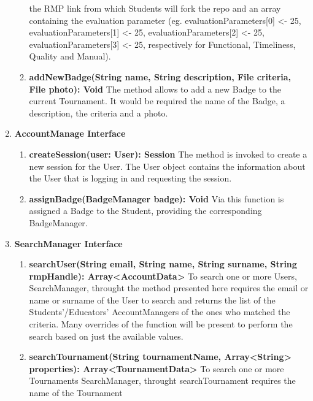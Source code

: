 \begin{enumerate}
\begin{enumerate}[label=$\bullet$]
            the RMP link from which Students will fork the repo and an array containing the evaluation parameter (eg. evaluationParameters[0] <- 25, evaluationParameters[1] <- 25, evaluationParameters[2] <- 25, evaluationParameters[3] <- 25,
            respectively for Functional, Timeliness, Quality and Manual).
            \item \textbf{addNewBadge(String name, String description, File criteria, File photo): Void} The method allows to add a new Badge to the current Tournament. It would be required the name of the Badge, a description, the criteria 
            and a photo.
        \end{enumerate}
    \item \textbf{AccountManage Interface} 
        \begin{enumerate}[label=$\bullet$]
            \item \textbf{createSession(user: User): Session} The method is invoked to create a new session for the User. The User object contains the information about the User that is logging in and requesting the session.
            \item \textbf{assignBadge(BadgeManager badge): Void} Via this function is assigned a Badge to the Student, providing the corresponding BadgeManager.
        \end{enumerate}
    \item \textbf{SearchManager Interface} 
        \begin{enumerate}[label=$\bullet$]
            \item \textbf{searchUser(String email, String name, String surname, String rmpHandle): Array<AccountData>} To search one or more Users, SearchManager, throught the method presented here requires the email or name or surname
            of the User to search and returns the list of the Students'/Educators' AccountManagers of the ones who matched the criteria. Many overrides of the function will be present to perform the search based on just the available values.
            \item \textbf{searchTournament(String tournamentName, Array<String> properties): Array<TournamentData> } To search one or more Tournaments SearchManager, throught searchTournament requires the name of the Tournament 

\end{enumerate}
\end{enumerate}

